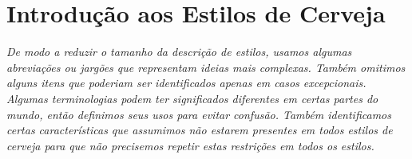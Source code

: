 \clearpage
{}
\divisorLine
\section*{Introdução aos Estilos de Cerveja}
\textit{De modo a reduzir o tamanho da descrição de estilos, usamos algumas abreviações ou jargões que representam ideias mais complexas. Também omitimos alguns itens que poderiam ser identificados apenas em casos excepcionais. Algumas terminologias podem ter significados diferentes em certas partes do mundo, então definimos seus usos para evitar confusão. Também identificamos certas características que assumimos não estarem presentes em todos estilos de cerveja para que não precisemos repetir estas restrições em todos os estilos.} \\
\begin{multicols*}{2}





\end{multicols*}
